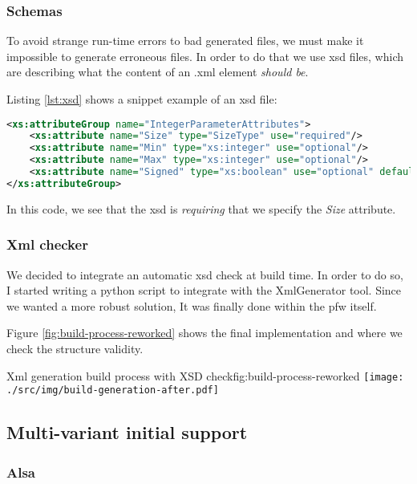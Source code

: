 \subsubsection{Schemas}
To avoid strange run-time errors to bad generated files, we must make it impossible to generate erroneous files.
In order to do that we use \gls{xsd} files, which are describing what the content of an .xml element \emph{should be}.

Listing \ref{lst:xsd} shows a snippet example of an \gls{xsd} file:

\begin{lstlisting}[language=XML, caption=XSD rules for an Integer parameter, label=lst:xsd]
<xs:attributeGroup name="IntegerParameterAttributes">
    <xs:attribute name="Size" type="SizeType" use="required"/>
    <xs:attribute name="Min" type="xs:integer" use="optional"/>
    <xs:attribute name="Max" type="xs:integer" use="optional"/>
    <xs:attribute name="Signed" type="xs:boolean" use="optional" default="false"/>
</xs:attributeGroup>
\end{lstlisting}

In this code, we see that the \gls{xsd} is \emph{requiring} that we specify the \emph{Size} attribute.

\subsubsection{Xml checker}
We decided to integrate an automatic \gls{xsd} check at build time. In order to do so, I started writing a python script
to integrate with the XmlGenerator tool. Since we wanted a more robust solution, It was finally done within the \gls{pfw} itself.

Figure \ref{fig:build-process-reworked} shows the final implementation and where we check the structure validity.

\begin{figureGraphics}{Xml generation build process with XSD check}{fig:build-process-reworked}
    \texttt{[image: ./src/img/build-generation-after.pdf]}
\end{figureGraphics}

\subsection{Multi-variant initial support}
\subsubsection{Alsa}
